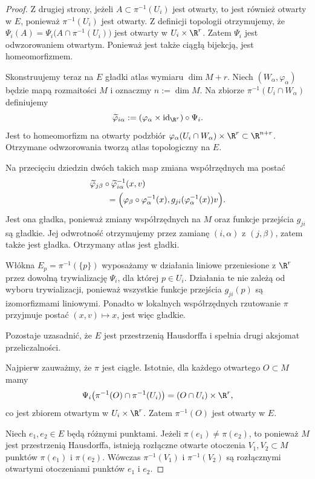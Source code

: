 \begin{proof}
Z drugiej strony, jeżeli
$A\subset\pi^{-1}(U_i)$ jest otwarty, to jest również
otwarty w $E$, ponieważ $\pi^{-1}(U_i)$ jest otwarty.
Z definicji topologii otrzymujemy, że $\Psi_i(A) =\Psi_i\bigl(A\cap\pi^{-1}(U_i)\bigr)$
jest otwarty w $U_i\times\R^r$.
Zatem $\Psi_i$ jest odwzorowaniem otwartym.
Ponieważ jest także ciągłą bijekcją, jest homeomorfizmem.

Skonstruujemy teraz na $E$ gładki atlas wymiaru
$\dim M+r$. Niech $(W_\alpha,\varphi_\alpha)$ będzie
mapą rozmaitości $M$ i oznaczmy $n:=\dim M$.
Na zbiorze $\pi^{-1}(U_i\cap W_\alpha)$ definiujemy
\[
\widetilde\varphi_{i\alpha}
:=
(\varphi_\alpha\times\operatorname{id}_{\R^r})
\circ\Psi_i.
\]
Jest to homeomorfizm na otwarty podzbiór $\varphi_\alpha(U_i\cap W_\alpha)\times\R^r \subset\R^{n+r}$.
Otrzymane odwzorowania tworzą atlas topologiczny na $E$.

Na przecięciu dziedzin dwóch takich map
zmiana współrzędnych ma postać
\[
\begin{aligned}
&\widetilde\varphi_{j\beta}
\circ\widetilde\varphi_{i\alpha}^{-1}(x,v)\\
&\qquad =
\Bigl(
\varphi_\beta\circ\varphi_\alpha^{-1}(x),
g_{ji}(\varphi_\alpha^{-1}(x))v
\Bigr).
\end{aligned}
\]
Jest ona gładka, ponieważ zmiany współrzędnych na
$M$ oraz funkcje przejścia $g_{ji}$ są gładkie.
Jej odwrotność otrzymujemy przez zamianę
$(i,\alpha)$ z $(j,\beta)$, zatem także jest gładka.
Otrzymany atlas jest gładki.

Włókna $E_p=\pi^{-1}(\{p\})$ wyposażamy w działania
liniowe przeniesione z $\R^r$ przez dowolną
trywializację $\Psi_i$, dla której $p\in U_i$.
Działania te nie zależą od wyboru trywializacji,
ponieważ wszystkie funkcje przejścia $g_{ji}(p)$
są izomorfizmami liniowymi.
Ponadto w lokalnych współrzędnych rzutowanie
$\pi$ przyjmuje postać $(x,v)\longmapsto x$,
jest więc gładkie.

Pozostaje uzasadnić, że $E$ jest przestrzenią
Hausdorffa i spełnia drugi aksjomat przeliczalności.

Najpierw zauważmy, że $\pi$ jest ciągłe.
Istotnie, dla każdego otwartego $O\subset M$ mamy
\[
\Psi_i\bigl(
\pi^{-1}(O)\cap\pi^{-1}(U_i)
\bigr)
=(O\cap U_i)\times\R^r,
\]
co jest zbiorem otwartym w $U_i\times\R^r$.
Zatem $\pi^{-1}(O)$ jest otwarty w $E$.

Niech $e_1,e_2\in E$ będą różnymi punktami.
Jeżeli $\pi(e_1)\ne\pi(e_2)$, to ponieważ $M$
jest przestrzenią Hausdorffa, istnieją rozłączne
otwarte otoczenia $V_1,V_2\subset M$ punktów
$\pi(e_1)$ i $\pi(e_2)$. Wówczas
$\pi^{-1}(V_1)$ i $\pi^{-1}(V_2)$ są rozłącznymi
otwartymi otoczeniami punktów $e_1$ i $e_2$.


\end{proof}
